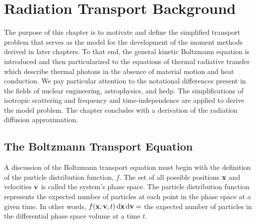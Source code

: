 \documentclass[../doc.tex]{subfiles}
\begin{document}
\chapter{Radiation Transport Background} \label{chap:transport}
The purpose of this chapter is to motivate and define the simplified transport problem that serves as the model for the development of the moment methods derived in later chapters. To that end, the general kinetic Boltzmann equation is introduced and then particularized to the equations of thermal radiative transfer which describe thermal photons in the absence of material motion and heat conduction. We pay particular attention to the notational differences present in the fields of nuclear engineering, astrophysics, and \gls{hedp}. The simplifications of isotropic scattering and frequency and time-independence are applied to derive the model problem. The chapter concludes with a derivation of the radiation diffusion approximation. 

\section{The Boltzmann Transport Equation}
A discussion of the Boltzmann transport equation must begin with the definition of the particle distribution function, $f$. 
The set of all possible positions $\boldsymbol{\mathrm{x}}$ and velocities $\boldsymbol{\mathrm{v}}$ is called the system's phase space. The particle distribution function represents the expected number of particles at each point in the phase space at a given time. In other words, $f(\boldsymbol{\mathrm{x}},\boldsymbol{\mathrm{v}},t) \mathop{}\!\mathrm{d} \boldsymbol{\mathrm{x}} \mathop{}\!\mathrm{d} \boldsymbol{\mathrm{v}} = $ the expected number of particles in the differential phase space volume at a time $t$. 
\end{document}
